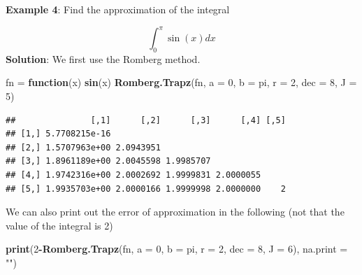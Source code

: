 \documentclass[
]{book}
\newenvironment{Shaded}{\begin{snugshade}}{\end{snugshade}}
\newcommand{\AttributeTok}[1]{\textcolor[rgb]{0.13,0.29,0.53}{#1}}
\newcommand{\ControlFlowTok}[1]{\textcolor[rgb]{0.13,0.29,0.53}{\textbf{#1}}}
\newcommand{\DecValTok}[1]{\textcolor[rgb]{0.00,0.00,0.81}{#1}}
\newcommand{\FunctionTok}[1]{\textcolor[rgb]{0.13,0.29,0.53}{\textbf{#1}}}
\newcommand{\NormalTok}[1]{#1}
\newcommand{\OtherTok}[1]{\textcolor[rgb]{0.56,0.35,0.01}{#1}}
\newcommand{\SpecialCharTok}[1]{\textcolor[rgb]{0.81,0.36,0.00}{\textbf{#1}}}
\newcommand{\StringTok}[1]{\textcolor[rgb]{0.31,0.60,0.02}{#1}}
\begin{document}
\textbf{Example 4}: Find the approximation of the integral

\[
\int_0^\pi \sin(x) dx
\]
\textbf{Solution}: We first use the Romberg method.

\begin{Shaded}
\begin{Highlighting}[]
\NormalTok{fn }\OtherTok{=} \ControlFlowTok{function}\NormalTok{(x) }\FunctionTok{sin}\NormalTok{(x)}
\FunctionTok{Romberg.Trapz}\NormalTok{(fn, }\AttributeTok{a =} \DecValTok{0}\NormalTok{, }\AttributeTok{b =}\NormalTok{ pi, }\AttributeTok{r =} \DecValTok{2}\NormalTok{, }\AttributeTok{dec =} \DecValTok{8}\NormalTok{, }\AttributeTok{J =} \DecValTok{5}\NormalTok{)}
\end{Highlighting}
\end{Shaded}

\begin{verbatim}
##               [,1]      [,2]      [,3]      [,4] [,5]
## [1,] 5.7708215e-16                                   
## [2,] 1.5707963e+00 2.0943951                         
## [3,] 1.8961189e+00 2.0045598 1.9985707               
## [4,] 1.9742316e+00 2.0002692 1.9999831 2.0000055     
## [5,] 1.9935703e+00 2.0000166 1.9999998 2.0000000    2
\end{verbatim}

We can also print out the error of approximation in the following (not that the value of the integral is 2)

\begin{Shaded}
\begin{Highlighting}[]
\FunctionTok{print}\NormalTok{(}\DecValTok{2}\SpecialCharTok{{-}}\FunctionTok{Romberg.Trapz}\NormalTok{(fn, }\AttributeTok{a =} \DecValTok{0}\NormalTok{, }\AttributeTok{b =}\NormalTok{ pi, }\AttributeTok{r =} \DecValTok{2}\NormalTok{, }\AttributeTok{dec =} \DecValTok{8}\NormalTok{, }\AttributeTok{J =} \DecValTok{6}\NormalTok{), }\AttributeTok{na.print =} \StringTok{""}\NormalTok{)}
\end{Highlighting}
\end{Shaded}
\end{document}
